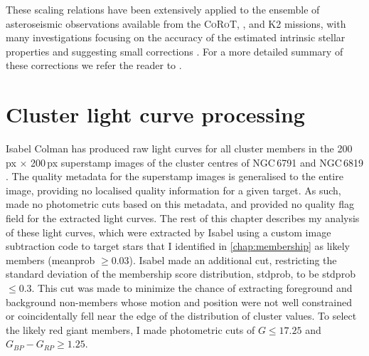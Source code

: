 These scaling relations have been extensively applied to the ensemble of asteroseismic observations available from the \textsc{CoRoT}, \Kepler{}, and K2 missions, with many investigations focusing on the accuracy of the estimated intrinsic stellar properties and suggesting small corrections \cite[e.g.][]{basu_determination_2010, white_calculating_2011, miglio_asteroseismology_2012}. For a more detailed summary of these corrections we refer the reader to \cite{hekker_scaling_2020}. 


%




\section{Cluster light curve processing}
\label{sect:lc_select}

Isabel Colman has produced raw light curves for all cluster members in the 200\,px $\times$ 200\,px \Kepler{} superstamp images of the cluster centres of NGC\,6791 and NGC\,6819 \citep{colman_pixels_2020}. The quality metadata for the superstamp images is generalised to the entire image, providing no localised quality information for a given target. As such, \cite{colman_pixels_2020} made no photometric cuts based on this metadata, and provided no quality flag field for the extracted light curves. The rest of this chapter describes my analysis of these light curves, which were extracted by Isabel using a custom image subtraction code to target stars that I identified in \cref{chap:membership} as likely members (meanprob $\ge 0.03$). Isabel made an additional cut, restricting the standard deviation of the membership score distribution, stdprob, to be stdprob $\leq 0.3$. This cut was made to minimize the chance of extracting foreground and background non-members whose motion and position were not well constrained or coincidentally fell near the edge of the distribution of cluster values. To select the likely red giant members, I made photometric cuts of $G \leq 17.25$ and $G_{BP}-G_{RP}\ge1.25$.

